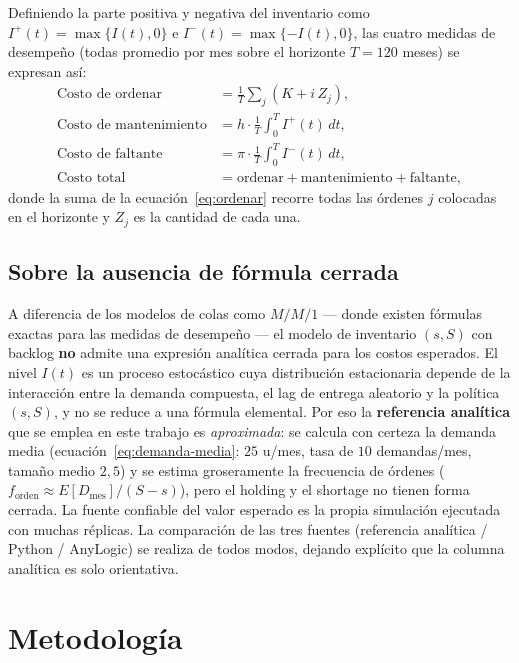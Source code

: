 \documentclass[11pt]{article}
\begin{document}
Definiendo la parte positiva y negativa del inventario como
$I^{+}(t) = \max\{I(t), 0\}$ e $I^{-}(t) = \max\{-I(t), 0\}$, las cuatro
medidas de desempe\~no (todas promedio por mes sobre el horizonte $T = 120$
meses) se expresan as\'i:
\begin{align}
\text{Costo de ordenar} &= \frac{1}{T}\sum_{j} \left(K + i\,Z_j\right),
  \label{eq:ordenar}\\
\text{Costo de mantenimiento} &= h \cdot \frac{1}{T}
  \int_{0}^{T} I^{+}(t)\,dt, \label{eq:holding}\\
\text{Costo de faltante} &= \pi \cdot \frac{1}{T}
  \int_{0}^{T} I^{-}(t)\,dt, \label{eq:shortage}\\
\text{Costo total} &= \text{ordenar} + \text{mantenimiento} +
  \text{faltante}, \label{eq:total}
\end{align}
donde la suma de la ecuaci\'on~\eqref{eq:ordenar} recorre todas las \'ordenes
$j$ colocadas en el horizonte y $Z_j$ es la cantidad de cada una.

\subsection{Sobre la ausencia de f\'ormula cerrada}

A diferencia de los modelos de colas como $M/M/1$ --- donde existen f\'ormulas
exactas para las medidas de desempe\~no --- el modelo de inventario $(s, S)$
con backlog \textbf{no} admite una expresi\'on anal\'itica cerrada para los
costos esperados. El nivel $I(t)$ es un proceso estoc\'astico cuya distribuci\'on
estacionaria depende de la interacci\'on entre la demanda compuesta, el lag de
entrega aleatorio y la pol\'itica $(s, S)$, y no se reduce a una f\'ormula
elemental. Por eso la \textbf{referencia anal\'itica} que se emplea en este
trabajo es \emph{aproximada}: se calcula con certeza la demanda media
(ecuaci\'on~\eqref{eq:demanda-media}: $25$ u/mes, tasa de $10$ demandas/mes,
tama\~no medio $2{,}5$) y se estima groseramente la frecuencia de \'ordenes
($f_{\text{orden}} \approx E[D_{\text{mes}}] / (S - s)$), pero el holding y el
shortage no tienen forma cerrada. La fuente confiable del valor esperado es la
propia simulaci\'on ejecutada con muchas r\'eplicas. La comparaci\'on de las
tres fuentes (referencia anal\'itica / Python / AnyLogic) se realiza de todos
modos, dejando expl\'icito que la columna anal\'itica es solo orientativa.

\section{Metodolog\'ia}
\end{document}
